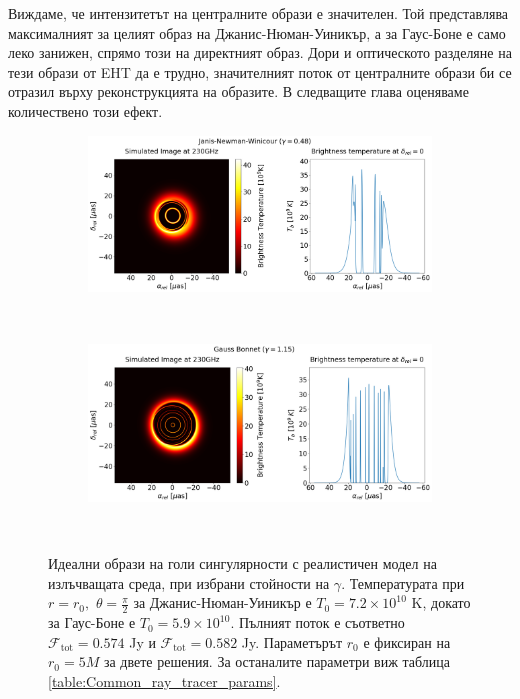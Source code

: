 \noindent Виждаме, че интензитетът на централните образи е значителен. Той представлява максималният за целият образ на Джанис-Нюман-Уиникър, а за Гаус-Боне е само леко занижен, спрямо този на директният образ. Дори и оптическото разделяне на тези образи от EHT да е трудно, значителният поток от централните образи би се отразил върху реконструкцията на образите. В следващите глава оценяваме количествено този ефект.
\newpage

\begin{figure}[h!]
	\centering
	\begin{subfigure}{12cm}
		\hspace{-1cm}
		\includegraphics[scale = 0.3]{Ray_tracer_plot_230_JNW.png}
	\end{subfigure}\\
	\begin{subfigure}{12cm}
		\hspace{-1cm}
		\includegraphics[scale = 0.3]{Ray_tracer_plot_230_GB.png}
	\end{subfigure}\\
	\label{Naked_Singularity_Ray_tracer_230}
	\caption[Идеални образи на голи сингулярности с реалистичен модел на излъчващата среда, при избрани стойности на $\gamma$.]{Идеални образи на голи сингулярности с реалистичен модел на излъчващата среда, при избрани стойности на $\gamma$. Температурата при $r = r_0,\,\,\theta = \frac{\pi}{2}$ за Джанис-Нюман-Уиникър е $T_0 = 7.2\times10^{10}$ K, докато за Гаус-Боне е $T_0 = 5.9\times10^{10}$. Пълният поток е съответно $\mathcal{F}_{\text{tot}} = 0.574$ Jy и $\mathcal{F}_{\text{tot}} = 0.582$ Jy. Параметърът $r_0$ е фиксиран на $r_0 = 5M$ за двете решения. За останалите параметри виж таблица \ref{table:Common_ray_tracer_params}.} 
\end{figure}


